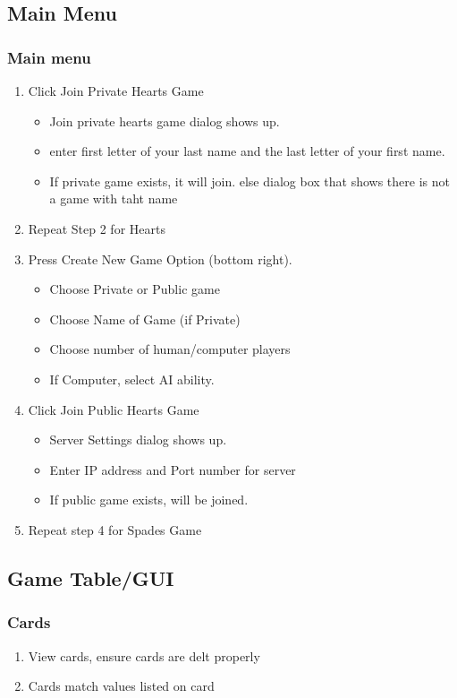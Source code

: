 \documentclass[11pt, titlepage]{article}
\begin{document}
\subsection{Main Menu}
	\subsubsection{Main menu}

	\begin{enumerate}
	  \item Click Join Private Hearts Game
			\begin{itemize}
	    \item Join private hearts game dialog shows up.
	    \item enter first letter of your last name and the last letter of your first name.
	    \item If private game exists, it will join. else dialog box that shows there is not a game with taht name
	  	\end{itemize}
		\item Repeat Step 2 for Hearts
	  \item Press Create New Game Option (bottom right).
	      \begin{itemize}
	    		\item Choose Private or Public game
	    		\item Choose Name of Game (if Private)
	      	\item Choose number of human/computer players
	      	\item If Computer, select AI ability.
	      \end{itemize}
	  \item Click Join Public Hearts Game
			\begin{itemize}
	    	\item Server Settings dialog shows up.
	      \item Enter IP address and Port number for server
	      \item If public game exists, will be joined.
			\end{itemize}
		\item Repeat step 4 for Spades Game
	\end{enumerate}

\subsection{Game Table/GUI}
	\subsubsection{Cards}
		\begin{enumerate}
			\item View  cards, ensure cards are delt properly
			\item Cards match values listed on card
		\end{enumerate}
\end{document}
